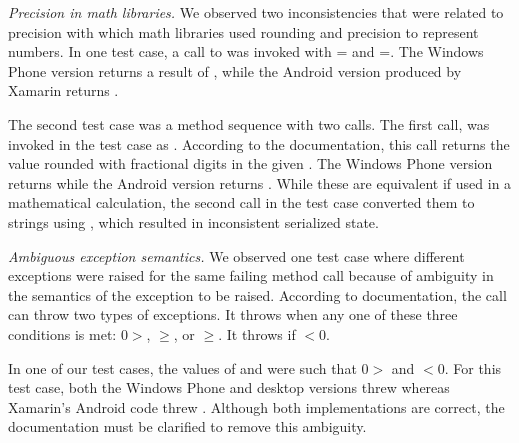 \begin{mybullet}
%
\item \textit{Precision in math libraries.} We observed two inconsistencies
that were related to precision with which math libraries used rounding and
precision to represent numbers. In one test case, a call to
 was invoked with
= and =.
The Windows Phone version returns a result of ,
while the Android version produced by Xamarin returns . 

The second test case was a method sequence with two calls. The first call,
 was
invoked in the test case as . According
to the documentation, this call returns the value  rounded with
 fractional digits in the given . The Windows Phone version
returns  while the Android version returns . While these
are equivalent if used in a mathematical calculation, the second call in the
test case converted them to strings using , which
resulted in inconsistent serialized state.
%
\item \textit{Ambiguous exception semantics.} We observed one test case where
different exceptions were raised for the same failing method call because of
ambiguity in the semantics of the exception to be raised.  According to
documentation, the 
call can throw two types of exceptions. It throws
 when any one of these three conditions is met:
0$>$, $\geqslant$, or
$\geqslant$. It throws
 if $<$0.

In one of our test cases, the values of  and  were such
that 0$>$ and $<$0. For this test case, both the Windows
Phone and desktop versions threw  whereas
Xamarin's Android code threw . Although both
implementations are correct, the documentation must be clarified to remove this
ambiguity.
%
\end{mybullet}

